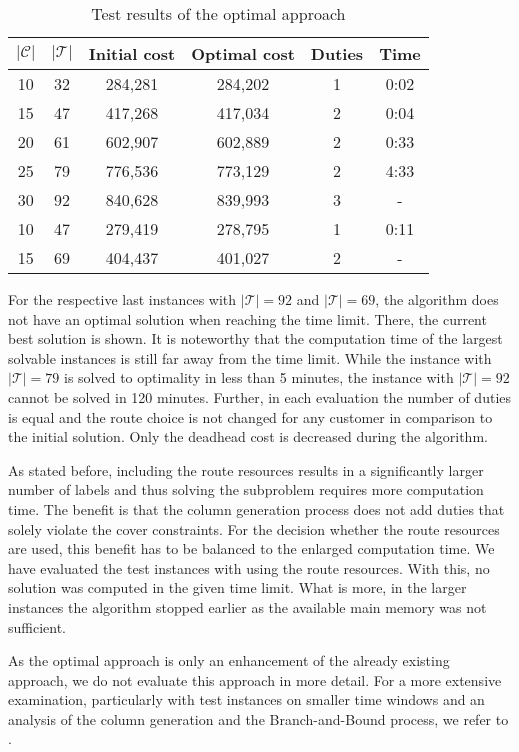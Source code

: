 \begin{table}[htb]
	\centering
	\begin{tabular}{cccccc}
		\toprule
		$\vert\mathcal{C}\vert$ & $\vert\mathcal{T}\vert$ & Initial cost & Optimal cost & Duties & Time \\
		\midrule
		10 & 32 & 284,281 & 284,202 & 1 & 0:02 \\
		15 & 47 & 417,268 & 417,034 & 2 & 0:04 \\
		20 & 61 & 602,907 & 602,889 & 2 & 0:33 \\
		25 & 79 & 776,536 & 773,129 & 2 & 4:33 \\
		30 & 92 & 840,628 & 839,993 & 3 &  - \\
		\midrule
		10 & 47 & 279,419 & 278,795 & 1 & 0:11 \\
		15 & 69 & 404,437 & 401,027 & 2 &  -   \\
		\bottomrule
	\end{tabular}
	\caption{Test results of the optimal approach}
	\label{tab:results:optimal}
\end{table}
		
For the respective last instances with ${\vert\mathcal{T}\vert=92}$ and ${\vert\mathcal{T}\vert=69}$, the algorithm does not have an optimal solution when reaching the time limit. There, the current best solution is shown. It is noteworthy that the computation time of the largest solvable instances is still far away from the time limit. While the instance with ${\vert\mathcal{T}\vert=79}$ is solved to optimality in less than 5 minutes, the instance with ${\vert\mathcal{T}\vert=92}$ cannot be solved in 120 minutes. Further, in each evaluation the number of duties is equal and the route choice is not changed for any customer in comparison to the initial solution. Only the deadhead cost is decreased during the algorithm.

As stated before, including the route resources results in a significantly larger number of labels and thus solving the subproblem requires more computation time. The benefit is that the column generation process does not add duties that solely violate the cover constraints. For the decision whether the route resources are used, this benefit has to be balanced to the enlarged computation time. We have evaluated the test instances with using the route resources. With this, no solution was computed in the given time limit. What is more, in the larger instances the algorithm stopped earlier as the available main memory was not sufficient.

As the optimal approach is only an enhancement of the already existing approach, we do not evaluate this approach in more detail. For a more extensive examination, particularly with test instances on smaller time windows and an analysis of the column generation and the Branch-and-Bound process, we refer to \cite[Sec.~10.2]{Kaiser}.

